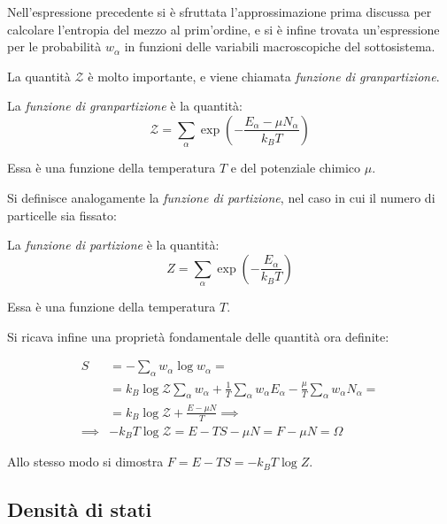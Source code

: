 \noindent Nell'espressione precedente si è sfruttata l'approssimazione prima discussa per calcolare l'entropia del mezzo al prim'ordine, e si è infine trovata un'espressione per le probabilità $w_\alpha$ in funzioni delle variabili macroscopiche del sottosistema.

La quantità $\mathcal{Z}$ è molto importante, e viene chiamata \textit{funzione di granpartizione}.

\begin{defn}
	La \textit{funzione di granpartizione} è la quantità:
	\begin{equation*}
	\mathcal{Z} = \sum_{\alpha} \exp \left(- \frac{E_\alpha - \mu N_\alpha}{k_BT}\right)
	\end{equation*}
	
	Essa è una funzione della temperatura $T$ e del potenziale chimico $\mu$.
\end{defn}

Si definisce analogamente la \textit{funzione di partizione}, nel caso in cui il numero di particelle sia fissato:

\begin{defn}
	La \textit{funzione di partizione} è la quantità:
	\begin{equation*}
	Z = \sum_{\alpha} \exp \left(- \frac{E_\alpha}{k_BT}\right)
	\end{equation*}
	
	Essa è una funzione della temperatura $T$.
\end{defn}

Si ricava infine una proprietà fondamentale delle quantità ora definite:

\begin{align*}
S &= - \sum_{\alpha} w_\alpha \log w_\alpha =\\
&= k_B \log \mathcal{Z} \sum_{\alpha} w_\alpha + \frac{1}{T} \sum_{\alpha} w_\alpha E_\alpha - \frac{\mu}{T} \sum_{\alpha} w_\alpha N_\alpha =\\
&= k_B \log \mathcal{Z} + \frac{E - \mu N}{T} \implies\\
\implies & - k_B T \log \mathcal{Z} = E - T S - \mu N = F - \mu N = \Omega
\end{align*}

Allo stesso modo si dimostra $F = E - T S = - k_B T \log Z$.

\subsection{Densità di stati}
\label{sec:stdens}

